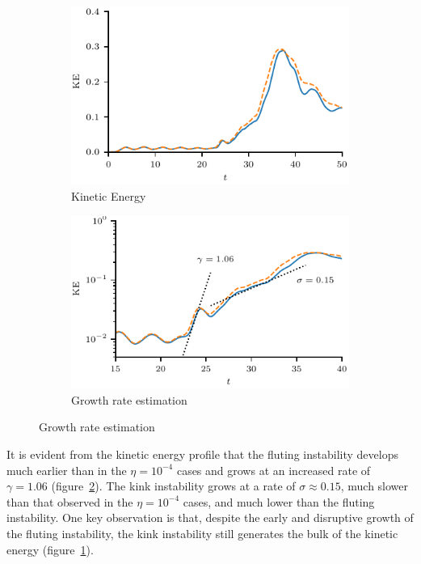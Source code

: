 \begin{figure}[t]
  \centering
    \begin{subfigure}{0.49\textwidth}
      \includegraphics[width=\linewidth]{kinetic_energy-3.pdf}
      \caption{Kinetic Energy}
      \label{fig:kink_ke-3}
    \end{subfigure}
    \hfill
    \begin{subfigure}{0.49\textwidth}
      \includegraphics[width=\linewidth]{kinetic_energy_log-3.pdf}
      \caption{Growth rate estimation}
      \label{fig:kink_ke_log-3}
    \end{subfigure}
\label{fig:kink_str8_ke-3}%
\end{figure}

It is evident from the kinetic energy profile that the fluting instability develops much earlier than in the $\eta=10^{-4}$ cases and grows at an increased rate of $\gamma = 1.06$ (figure~\ref{fig:kink_ke_log-3}). The kink instability grows at a rate of $\sigma \approx 0.15$, much slower than that observed in the $\eta=10^{-4}$ cases, and much lower than the fluting instability. One key observation is that, despite the early and disruptive growth of the fluting instability, the kink instability still generates the bulk of the kinetic energy (figure~\ref{fig:kink_ke-3}).

